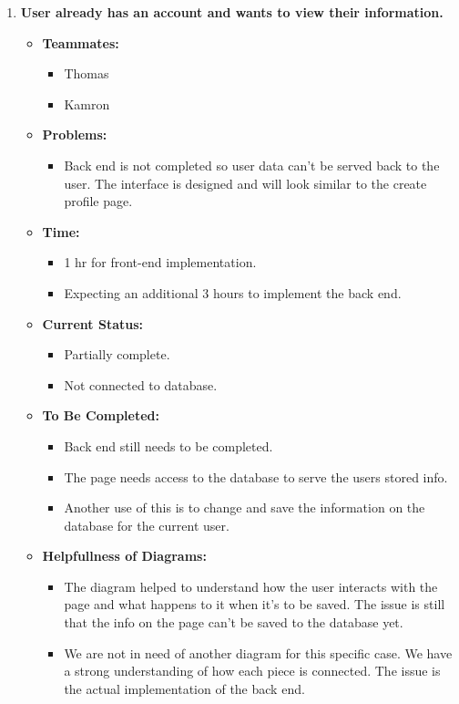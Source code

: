 \documentclass[12pt]{article}
\begin{document}
\begin{enumerate}
    \item \textbf{User already has an account and wants to view their information.}
      \begin{itemize}
        \item \textbf{Teammates:}
          \begin{itemize}
            \item Thomas
            \item Kamron
          \end{itemize}
        \item \textbf{Problems:}
          \begin{itemize}
            \item Back end is not completed so user data can’t be served back to the user. The interface is designed and will look similar to the create profile page.
          \end{itemize}
        \item \textbf{Time:}
          \begin{itemize}
            \item 1 hr for front-end implementation.
            \item Expecting an additional 3 hours to implement the back end.
          \end{itemize}
        \item \textbf{Current Status:}
          \begin{itemize}
            \item Partially complete.
            \item Not connected to database.
          \end{itemize}
        \item \textbf{To Be Completed:}
          \begin{itemize}
            \item Back end still needs to be completed.
            \item The page needs access to the database to serve the users stored info.
            \item Another use of this is to change and save the information on the database for the current user.
          \end{itemize}
        \item \textbf{Helpfullness of Diagrams:}
          \begin{itemize}
            \item The diagram helped to understand how the user interacts with the page and what happens to it when it’s to be saved. The issue is still that the info on the page can’t be saved to the database yet.
            \item We are not in need of another diagram for this specific case. We have a strong understanding of how each piece is connected. The issue is the actual implementation of the back end.
          \end{itemize}
      \end{itemize}
  
\end{enumerate}
\end{document}

